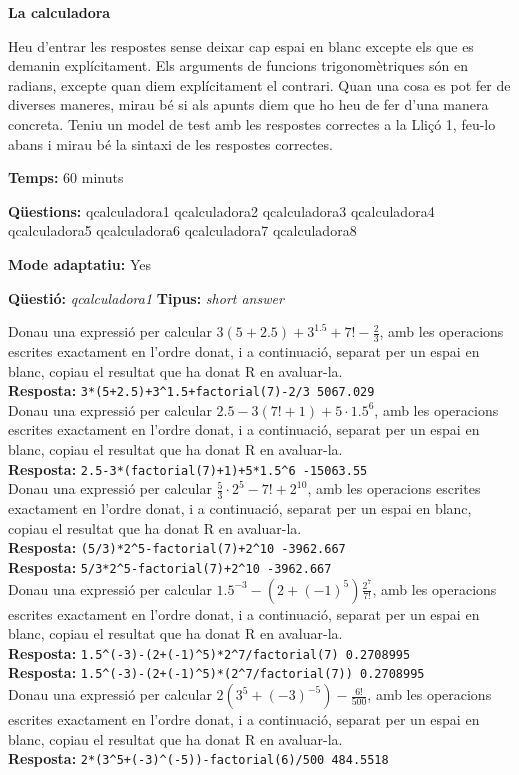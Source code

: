 \documentclass[10pt]{article}
\newcommand{\answer}{\textbf{Resposta: }}
\newcommand{\titletest}[1]{\centerline{\Large\textbf{#1}}\medskip}
\newcommand{\timetest}[1]{\noindent\textbf{Temps:} #1 minuts}
\newcommand{\questionstest}{\noindent\textbf{Qüestions: }}
\newcommand{\adaptativetest}{\noindent\textbf{Mode adaptatiu: }}
\newcommand{\newquestion}[2]{\noindent\textbf{Qüestió: }\emph{#1} \textbf{Tipus: }\emph{#2}\medskip}
\newenvironment{introtest}{}{\newpage}
\begin{document}
\begin{introtest}
\titletest{La calculadora}

Heu d'entrar les respostes sense deixar cap espai en blanc excepte els que es demanin explícitament. Els arguments de funcions trigonomètriques són en radians, excepte quan diem explícitament el contrari. Quan una cosa es pot fer de diverses maneres, mirau bé si als apunts diem que ho heu de fer d'una manera concreta.  Teniu un model de test amb les respostes correctes a la Lliçó 1, feu-lo abans i mirau bé la sintaxi de les respostes correctes.  

\timetest{60}

\questionstest qcalculadora1 qcalculadora2 qcalculadora3 qcalculadora4 qcalculadora5 qcalculadora6 qcalculadora7 qcalculadora8

\adaptativetest Yes
\end{introtest}

\newquestion{qcalculadora1}{short answer} 
\def\qcalculadora1#1{Donau una expressió per calcular $#1$,  amb les operacions escrites exactament en l'ordre donat, i a continuació, separat per un espai en blanc, copiau el resultat que ha donat R en avaluar-la.}

\qcalculadora1{3(5+2.5)+3^{1.5}+7!-\frac{2}{3}}\\ 
\answer{\verb?3*(5+2.5)+3^1.5+factorial(7)-2/3 5067.029?}\\

\qcalculadora1{2.5-3(7!+1)+5\cdot 1.5^6}\\
\answer{\verb?2.5-3*(factorial(7)+1)+5*1.5^6 -15063.55?}\\

\qcalculadora1{\frac{5}{3}\cdot 2^5-7!+2^{10}}\\
\answer{\verb?(5/3)*2^5-factorial(7)+2^10 -3962.667?}\\
\answer{\verb?5/3*2^5-factorial(7)+2^10 -3962.667?}\\

\qcalculadora1{1.5^{-3}-(2+(-1)^5)\frac{2^7}{7!}}\\
\answer{\verb?1.5^(-3)-(2+(-1)^5)*2^7/factorial(7) 0.2708995?}\\
\answer{\verb?1.5^(-3)-(2+(-1)^5)*(2^7/factorial(7)) 0.2708995?}\\

\qcalculadora1{2(3^5+(-3)^{-5})-\frac{6!}{500}}\\
\answer{\verb?2*(3^5+(-3)^(-5))-factorial(6)/500 484.5518?}\\
\end{document}
